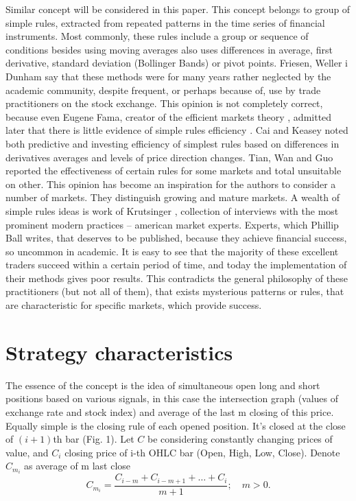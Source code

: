 \documentclass{tewiart}
\begin{document}
Similar concept will be considered in this paper. This concept belongs to group of simple rules, extracted from repeated patterns in the time series of financial instruments. Most commonly, these rules include a group or sequence of conditions besides using moving averages also uses differences in average, first derivative, standard deviation (Bollinger Bands) or pivot points. Friesen, Weller i Dunham \cite{friesen09} say that these methods were for many years rather neglected by the academic community, despite frequent, or perhaps because of, use by trade practitioners on the stock exchange. This opinion is not completely correct, because even Eugene Fama, creator of the efficient markets theory \cite{fama91}, admitted later that  there is little evidence of simple rules efficiency \cite{fama98}. Cai and Keasey \cite{cai05} noted both predictive and investing efficiency of simplest rules based on differences in derivatives averages and levels of price direction changes. Tian, Wan and Guo \cite{tian02} reported the effectiveness of certain rules for some markets and total unsuitable on other. This opinion has become an inspiration for the authors to consider a number of markets. They distinguish growing and mature markets. A wealth of simple rules ideas is work of Krutsinger \cite{krutsinger99}, collection of interviews with the most prominent modern practices – american market experts. Experts, which Phillip Ball \cite{ball07} writes, that deserves to be published, because they achieve financial success, so uncommon in academic.
It is easy to see that the majority of these excellent traders succeed within a certain period of time, and today the implementation of their methods gives poor results. This contradicts the general philosophy of these practitioners (but not all of them), that exists mysterious patterns or rules, that are characteristic for specific markets, which provide success.
\section{Strategy characteristics}
\indent The essence of the concept is the idea of simultaneous open long and short positions based on various signals, in this case the intersection graph (values of exchange rate  and stock index) and average of the last m closing of this price.\\
Equally simple is the closing rule of each opened position. It's closed at the close of $(i+1)$th bar (Fig. 1).
Let $C$ be considering constantly changing prices of value, and $C_i$ closing price of i-th OHLC bar (Open, High, Low, Close). Denote $C_{m_{i}}$ as average of m last close
\begin{equation} \label{label-of-equation-1}
  C_{m_{i}} = \frac{C_{i-m} + C_{i-m+1} + … + C_{i}}{m+1}; \hspace{1em}m>0. 
\end{equation}
 
\end{document}
